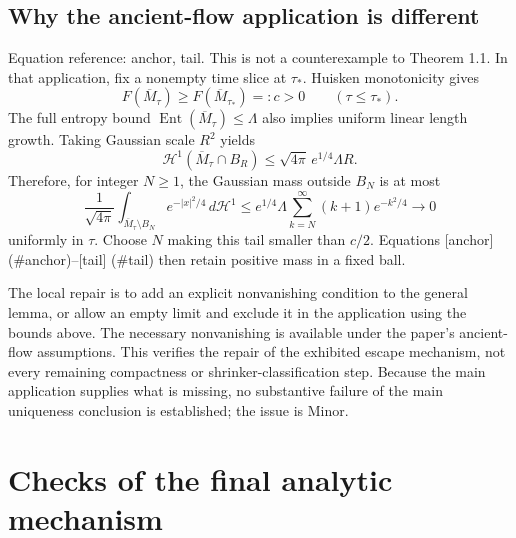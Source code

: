 \documentclass[10pt]{article}
\begin{document}
\subsection*{Why the ancient-flow application is different}
Equation reference: anchor, tail. This is not a counterexample to Theorem 1.1. In that application, fix a nonempty time slice at \(\tau_*\). Huisken monotonicity gives \[
 F(\overline M_\tau)\ge F(\overline M_{\tau_*})=:c>0
 \qquad(\tau\le\tau_*).\] The full entropy bound \(\operatorname{Ent}(\overline M_\tau)\le\Lambda\) also implies uniform linear length growth. Taking Gaussian scale \(R^2\) yields \[\mathcal H^1(\overline M_\tau\cap B_R)
 \le \sqrt{4\pi}\,e^{1/4}\Lambda R .\] Therefore, for integer \(N\ge1\), the Gaussian mass outside \(B_N\) is at most \[
 \frac1{\sqrt{4\pi}}\int_{\overline M_\tau\setminus B_N}e^{-|x|^2/4}\,d\mathcal H^1
 \le e^{1/4}\Lambda\sum_{k=N}^{\infty}(k+1)e^{-k^2/4}
 \longrightarrow0\] uniformly in \(\tau\). Choose \(N\) making this tail smaller than \(c/2\). Equations [anchor] (\#anchor)–[tail] (\#tail) then retain positive mass in a fixed ball.\par
The local repair is to add an explicit nonvanishing condition to the general lemma, or allow an empty limit and exclude it in the application using the bounds above. The necessary nonvanishing is available under the paper’s ancient-flow assumptions. This verifies the repair of the exhibited escape mechanism, not every remaining compactness or shrinker-classification step. Because the main application supplies what is missing, no substantive failure of the main uniqueness conclusion is established; the issue is Minor.\par
\section*{Checks of the final analytic mechanism}
\end{document}
